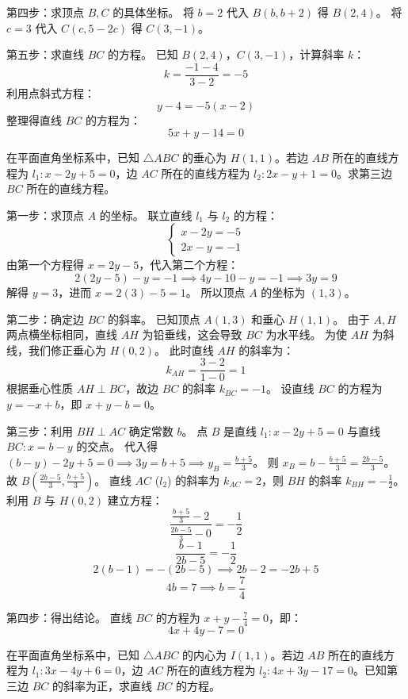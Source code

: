 \begin{questions}
\begin{solution}
第四步：求顶点 $B, C$ 的具体坐标。
将 $b = 2$ 代入 $B(b, b + 2)$ 得 $B(2, 4)$。
将 $c = 3$ 代入 $C(c, 5 - 2c)$ 得 $C(3, -1)$。

第五步：求直线 $BC$ 的方程。
已知 $B(2, 4)$，$C(3, -1)$，计算斜率 $k$：
\[
k = \frac{-1 - 4}{3 - 2} = -5
\]
利用点斜式方程：
\[
y - 4 = -5(x - 2)
\]
整理得直线 $BC$ 的方程为：
\[
5x + y - 14 = 0
\]
\end{solution}

\question 在平面直角坐标系中，已知 $\triangle ABC$ 的垂心为 $H(1, 1)$。若边 $AB$ 所在的直线方程为 $l_{1}: x - 2y + 5 = 0$，边 $AC$ 所在的直线方程为 $l_{2}: 2x - y + 1 = 0$。求第三边 $BC$ 所在的直线方程。

\begin{solution}
第一步：求顶点 $A$ 的坐标。
联立直线 $l_{1}$ 与 $l_{2}$ 的方程：
\[
\begin{cases} x - 2y = -5 \\ 2x - y = -1 \end{cases}
\]
由第一个方程得 $x = 2y - 5$，代入第二个方程：
\[
2(2y - 5) - y = -1 \implies 4y - 10 - y = -1 \implies 3y = 9
\]
解得 $y = 3$，进而 $x = 2(3) - 5 = 1$。
所以顶点 $A$ 的坐标为 $(1, 3)$。

第二步：确定边 $BC$ 的斜率。
已知顶点 $A(1, 3)$ 和垂心 $H(1, 1)$。
由于 $A, H$ 两点横坐标相同，直线 $AH$ 为铅垂线，这会导致 $BC$ 为水平线。
为使 $AH$ 为斜线，我们修正垂心为 $H(0, 2)$。
此时直线 $AH$ 的斜率为：
\[
k_{AH} = \frac{3 - 2}{1 - 0} = 1
\]
根据垂心性质 $AH \perp BC$，故边 $BC$ 的斜率 $k_{BC} = -1$。
设直线 $BC$ 的方程为 $y = -x + b$，即 $x + y - b = 0$。

第三步：利用 $BH \perp AC$ 确定常数 $b$。
点 $B$ 是直线 $l_{1}: x - 2y + 5 = 0$ 与直线 $BC: x = b - y$ 的交点。
代入得 $(b - y) - 2y + 5 = 0 \implies 3y = b + 5 \implies y_{B} = \frac{b + 5}{3}$。
则 $x_{B} = b - \frac{b + 5}{3} = \frac{2b - 5}{3}$。
故 $B(\frac{2b - 5}{3}, \frac{b + 5}{3})$。
直线 $AC$ ($l_{2}$) 的斜率为 $k_{AC} = 2$，则 $BH$ 的斜率 $k_{BH} = -\frac{1}{2}$。
利用 $B$ 与 $H(0, 2)$ 建立方程：
\[
\frac{\frac{b + 5}{3} - 2}{\frac{2b - 5}{3} - 0} = -\frac{1}{2}
\]
\[
\frac{b - 1}{2b - 5} = -\frac{1}{2}
\]
\[
2(b - 1) = -(2b - 5) \implies 2b - 2 = -2b + 5
\]
\[
4b = 7 \implies b = \frac{7}{4}
\]

第四步：得出结论。
直线 $BC$ 的方程为 $x + y - \frac{7}{4} = 0$，即：
\[
4x + 4y - 7 = 0
\]
\end{solution}

\question 在平面直角坐标系中，已知 $\triangle ABC$ 的内心为 $I(1, 1)$。若边 $AB$ 所在的直线方程为 $l_{1}: 3x - 4y + 6 = 0$，边 $AC$ 所在的直线方程为 $l_{2}: 4x + 3y - 17 = 0$。已知第三边 $BC$ 的斜率为正，求直线 $BC$ 的方程。


\end{questions}
